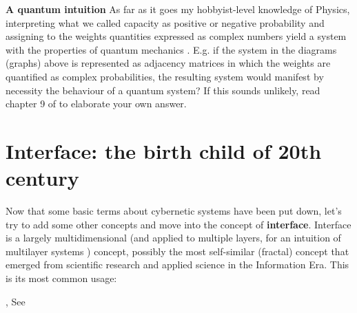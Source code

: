 \documentclass[14pt]{extarticle}
\begin{document}
\newline
\hspace*{7.5mm}\textbf{A quantum intuition}
\newline
As far as it goes my hobbyist-level knowledge of Physics, interpreting what we called capacity as positive or negative probability and assigning to the weights quantities expressed as complex numbers yield a system with the properties of quantum mechanics \cite{Aaronson10.5555/2487754}. E.g. if the system in the diagrams (graphs) above is represented as adjacency matrices in which the weights are quantified as complex probabilities, the resulting system would manifest by necessity the behaviour of a quantum system? If this sounds unlikely, read chapter 9 of \cite{Aaronson10.5555/2487754} to elaborate your own answer.

\section*{Interface: the birth child of 20th century}
\label{sec:interface}%

\hspace*{15mm}Now that some basic terms about cybernetic systems have been put down, let’s try to add some other concepts and move into the concept of \textbf{interface}. Interface is a largely multidimensional (and applied to multiple layers, for an intuition of multilayer systems \cite{Shchurov2015,Grassi2021,Thakare2021,Thakare20212}) concept, possibly the most self-similar (fractal) concept that emerged from scientific research and applied science in the Information Era. This is its most common usage:
\begin{center}
\begin{minipage}[t]{0.75\linewidth}
, See \cite{ETYMOinterface}
\end{minipage}
\end{center}
\end{document}
